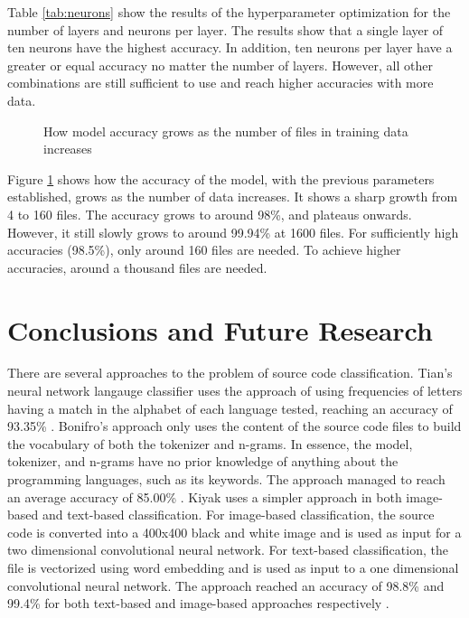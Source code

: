 \documentclass[acmlarge]{acmart}
\begin{document}
Table \ref{tab:neurons} show the results of the hyperparameter optimization for the
number of layers and neurons per layer. The results show that a single layer of ten
neurons have the highest accuracy. In addition, ten neurons per layer have a greater
or equal accuracy no matter the number of layers. However, all other combinations are
still sufficient to use and reach higher accuracies with more data.

\begin{figure}[htbp]
  \centering
  
  \caption{How model accuracy grows as the number of files in training data increases}
  \label{fig:datanum}
\end{figure}

Figure \ref{fig:datanum} shows how the accuracy of the model, with the previous parameters
established, grows as the number of data increases. It shows a sharp growth from 4 to 160
files. The accuracy grows to around 98\%, and plateaus onwards. However, it still slowly
grows to around 99.94\% at 1600 files. For sufficiently high accuracies (98.5\%), only around
160 files are needed. To achieve higher accuracies, around a thousand files are needed.

\section{Conclusions and Future Research}
There are several approaches to the problem of source code classification. Tian's neural network
langauge classifier uses the approach of using frequencies of letters having a match in the alphabet
of each language tested, reaching an accuracy of 93.35\% \cite{TianSuontausta2003}.
Bonifro's approach only uses the content of the source code files to build the vocabulary of both
the tokenizer and n-grams. In essence, the model, tokenizer, and n-grams have no prior knowledge of
anything about the programming languages, such as its keywords. The approach managed to reach an
average accuracy of 85.00\% \cite{BonifroStefano2021}. 
Kiyak uses a simpler approach in both image-based and text-based classification. For image-based
classification, the source code is converted into a 400x400 black and white image and is used as input
for a two dimensional convolutional neural network. For text-based classification, the file is vectorized
using word embedding and is used as input to a one dimensional convolutional neural network. The approach
reached an accuracy of 98.8\% and 99.4\% for both text-based and image-based approaches respectively
\cite{KiyakBirant2020}.
\end{document}
